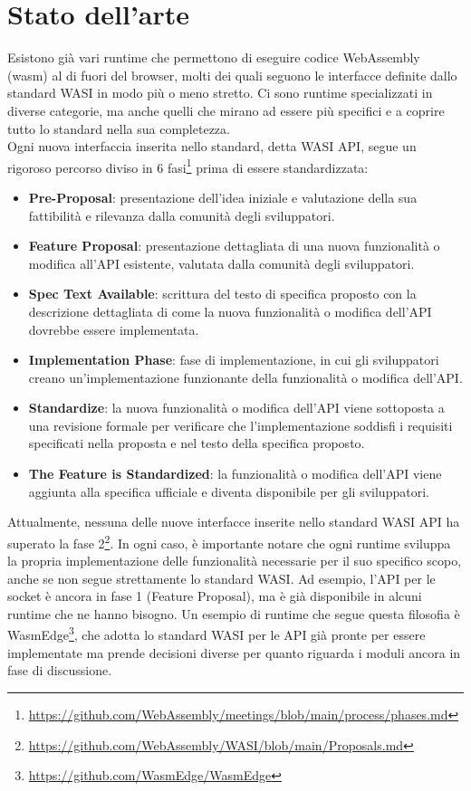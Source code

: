 \section{Stato dell'arte}
Esistono già vari runtime che permettono di eseguire codice WebAssembly (wasm) al di fuori del browser, molti dei quali seguono le interfacce definite dallo standard WASI in modo più o meno stretto. Ci sono runtime specializzati in diverse categorie, ma anche quelli che mirano ad essere più specifici e a coprire tutto lo standard nella sua completezza.
\\
Ogni nuova interfaccia inserita nello standard, detta WASI API, segue un rigoroso percorso diviso in 6 fasi\footnote{\url{https://github.com/WebAssembly/meetings/blob/main/process/phases.md}} prima di essere standardizzata:
\begin{itemize}
    \item \textbf{Pre-Proposal}: presentazione dell'idea iniziale e valutazione della sua fattibilità e rilevanza dalla comunità degli sviluppatori.
    \item \textbf{Feature Proposal}: presentazione dettagliata di una nuova funzionalità o modifica all'API esistente, valutata dalla comunità degli sviluppatori.
    \item \textbf{Spec Text Available}: scrittura del testo di specifica proposto con la descrizione dettagliata di come la nuova funzionalità o modifica dell'API dovrebbe essere implementata.
    \item \textbf{Implementation Phase}: fase di implementazione, in cui gli sviluppatori creano un'implementazione funzionante della funzionalità o modifica dell'API.
    \item \textbf{Standardize}: la nuova funzionalità o modifica dell'API viene sottoposta a una revisione formale per verificare che l'implementazione soddisfi i requisiti specificati nella proposta e nel testo della specifica proposto.
    \item \textbf{The Feature is Standardized}: la funzionalità o modifica dell'API viene aggiunta alla specifica ufficiale e diventa disponibile per gli sviluppatori.
\end{itemize}


Attualmente, nessuna delle nuove interfacce inserite nello standard WASI API ha superato la fase 2\footnote{\url{https://github.com/WebAssembly/WASI/blob/main/Proposals.md}}.
In ogni caso, è importante notare che ogni runtime sviluppa la propria implementazione delle funzionalità necessarie per il suo specifico scopo, anche se non segue strettamente lo standard WASI. Ad esempio, l'API per le socket è ancora in fase 1 (Feature Proposal), ma è già disponibile in alcuni runtime che ne hanno bisogno. Un esempio di runtime che segue questa filosofia è WasmEdge\footnote{\url{https://github.com/WasmEdge/WasmEdge}}, che adotta lo standard WASI per le API già pronte per essere implementate ma prende decisioni diverse per quanto riguarda i moduli ancora in fase di discussione.

